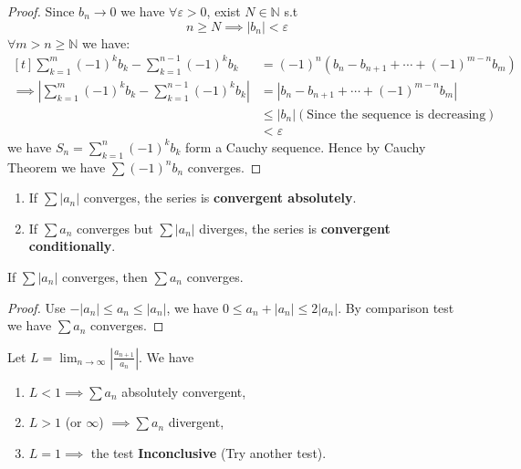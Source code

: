 \documentclass[
	UTF-8,
	11pt, %
	a4paper, %
]{LegrandOrangeBook}
\begin{document}
    \begin{proof}
        Since $ b_n \to 0$ we have $\forall \varepsilon >0$, exist $N \in \mathbb{N}$ s.t 
        $$
            n \geq N \implies |b_n| < \varepsilon 
        $$
        $\forall m>n \geq \mathbb{N}$ we have:$$
        \begin{aligned}[t]
            \sum_{k=1}^{m} (-1)^k b_k - \sum_{k=1}^{n-1} (-1)^k b_k 
            &= (-1)^{n}\left( b_n -b_{n+1} + \cdots +(-1)^{m-n}b_{m} \right) \\
            \implies \left| \sum_{k=1}^{m} (-1)^k b_k - \sum_{k=1}^{n-1} (-1)^k b_k  \right| &= \left| b_n -b_{n+1} + \cdots +(-1)^{m-n}b_{m} \right| \\
            &\leq \left| b_n \right| (\text{Since the sequence is decreasing}) \\
            &< \varepsilon 
        \end{aligned}$$
        we have $S_n = \sum_{k=1}^{n} (-1)^k b_k$ form a Cauchy sequence. Hence 
        by Cauchy Theorem we have $\sum (-1)^n b_n$ converges.
    \end{proof}

    \newpage

    \begin{definition}\quad
        \begin{enumerate}
            \item If $\sum |a_n|$ converges, the series is \textbf{convergent absolutely}.
            \item If $\sum a_n$ converges but $\sum |a_n|$ diverges, the series is \textbf{convergent conditionally}.
        \end{enumerate}

    \end{definition}

    \begin{theorem}
        If $\sum |a_n|$ converges, then $\sum a_n$ converges.
    \end{theorem}

    \begin{proof}
        Use $-|a_n|\leq a_n \leq |a_n|$, we have $0 \leq a_n +|a_n| \leq 2|a_n|$. By comparison test we have 
        $\sum a_n$ converges.
    \end{proof}

    \begin{theorem}
        Let $L = \lim_{n \to \infty} \left| \frac{a_{n+1}}{a_n} \right|$. We have
            \begin{enumerate}
                \item $L < 1 \implies \sum a_n$ absolutely convergent,
                \item $L > 1$ (or $\infty$) $\implies \sum a_n$ divergent,
                \item $L = 1 \implies$ the test \textbf{Inconclusive} (Try another test).
            \end{enumerate}
    \end{theorem}
\end{document}
